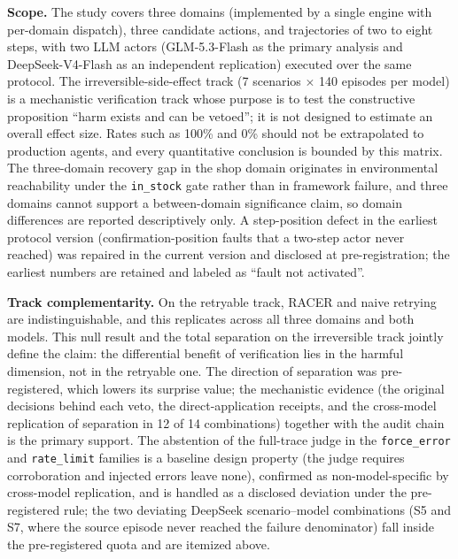 \documentclass[10pt]{article}
\begin{document}
\textbf{Scope.} The study covers three domains (implemented by a single engine with per-domain dispatch), three candidate actions, and trajectories of two to eight steps, with two LLM actors (GLM-5.3-Flash as the primary analysis and DeepSeek-V4-Flash as an independent replication) executed over the same protocol. The irreversible-side-effect track (7 scenarios $\times$ 140 episodes per model) is a mechanistic verification track whose purpose is to test the constructive proposition ``harm exists and can be vetoed''; it is not designed to estimate an overall effect size. Rates such as 100\% and 0\% should not be extrapolated to production agents, and every quantitative conclusion is bounded by this matrix. The three-domain recovery gap in the shop domain originates in environmental reachability under the \texttt{in\_stock} gate rather than in framework failure, and three domains cannot support a between-domain significance claim, so domain differences are reported descriptively only. A step-position defect in the earliest protocol version (confirmation-position faults that a two-step actor never reached) was repaired in the current version and disclosed at pre-registration; the earliest numbers are retained and labeled as ``fault not activated''.

\textbf{Track complementarity.} On the retryable track, RACER and naive retrying are indistinguishable, and this replicates across all three domains and both models. This null result and the total separation on the irreversible track jointly define the claim: the differential benefit of verification lies in the harmful dimension, not in the retryable one. The direction of separation was pre-registered, which lowers its surprise value; the mechanistic evidence (the original decisions behind each veto, the direct-application receipts, and the cross-model replication of separation in 12 of 14 combinations) together with the audit chain is the primary support. The abstention of the full-trace judge in the \texttt{force\_error} and \texttt{rate\_limit} families is a baseline design property (the judge requires corroboration and injected errors leave none), confirmed as non-model-specific by cross-model replication, and is handled as a disclosed deviation under the pre-registered rule; the two deviating DeepSeek scenario--model combinations (S5 and S7, where the source episode never reached the failure denominator) fall inside the pre-registered quota and are itemized above.
\end{document}
